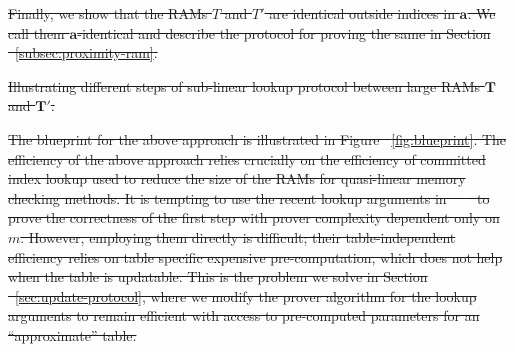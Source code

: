 \documentclass[sigconf]{acmart}
\renewcommand{\vec}{\mathbf} %
\newcommand{\vecT}{\vec{T}}
\providecommand{\DIFdeltex}[1]{{\protect\color{red}\sout{#1}}}                      %
\providecommand{\DIFdelFL}[1]{\DIFdel{#1}} %
\providecommand{\DIFdel}[1]{\texorpdfstring{\DIFdeltex{#1}}{}} %
\begin{document}
	\DIFdel{Finally, we show that the RAMs $T$ and $T'$ are identical outside indices in $\vec{a}$. We call them $\vec{a}$-identical
		and describe the protocol for proving the same in Section ~\ref{subsec:proximity-ram}.
	}%
	
	{%
		\DIFdelFL{Illustrating different steps of sub-linear lookup protocol between large RAMs $\vecT$ and $\vecT'$.}}
	
	\DIFdel{The blueprint for the above approach is illustrated in Figure ~\ref{fig:blueprint}.
		The efficiency of the above approach relies crucially on the efficiency of committed index lookup used to reduce the size of the RAMs for quasi-linear memory checking methods. It is tempting to use the recent lookup arguments
		in ~\mbox{%
			\cite{CCS:ZBKMNS22,EPRINT:PosKat22,EPRINT:EagFioGab22} }\hskip0pt%
		to prove the correctness of the first step with prover complexity dependent only on $m$.
		However, employing them directly is difficult; their table-independent efficiency relies on
		table specific expensive pre-computation, which does not help when the table is updatable. This is the problem we solve
		in Section ~\ref{sec:update-protocol}, where we modify the prover algorithm for the lookup arguments to remain efficient
		with access to pre-computed parameters for an ``approximate'' table.
	}%
	
\end{document}
